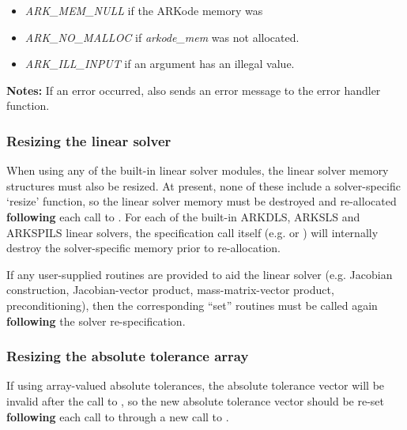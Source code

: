 \documentclass[letterpaper,10pt,english]{sphinxmanual}
\begin{document}
\begin{fulllineitems}
\begin{description}
\begin{itemize}
\item {} 
\emph{ARK\_MEM\_NULL}  if the ARKode memory was 

\item {} 
\emph{ARK\_NO\_MALLOC} if \emph{arkode\_mem} was not allocated.

\item {} 
\emph{ARK\_ILL\_INPUT} if an argument has an illegal value.

\end{itemize}

\end{description}

\textbf{Notes:} If an error occurred, {\hyperref[c_interface/User_callable:c.ARKodeResize]{\emph{}}} also sends an error
message to the error handler function.

\end{fulllineitems}



\subsubsection{Resizing the linear solver}
\label{c_interface/User_callable:resizing-the-linear-solver}
When using any of the built-in linear solver modules, the linear
solver memory structures must also be resized.  At present, none of
these include a solver-specific `resize' function, so the linear
solver memory must be destroyed and re-allocated \textbf{following} each
call to {\hyperref[c_interface/User_callable:c.ARKodeResize]{\emph{}}}.  For each of the built-in ARKDLS,
ARKSLS and ARKSPILS linear solvers, the specification call itself
(e.g. {\hyperref[c_interface/User_callable:c.ARKDense]{\emph{}}} or {\hyperref[c_interface/User_callable:c.ARKSpgmr]{\emph{}}}) will internally
destroy the solver-specific memory prior to re-allocation.

If any user-supplied routines are provided to aid the linear solver
(e.g. Jacobian construction, Jacobian-vector product,
mass-matrix-vector product, preconditioning), then the corresponding
``set'' routines must be called again \textbf{following} the solver
re-specification.


\subsubsection{Resizing the absolute tolerance array}
\label{c_interface/User_callable:resizing-the-absolute-tolerance-array}
If using array-valued absolute tolerances, the absolute tolerance
vector will be invalid after the call to {\hyperref[c_interface/User_callable:c.ARKodeResize]{\emph{}}}, so
the new absolute tolerance vector should be re-set \textbf{following} each
call to {\hyperref[c_interface/User_callable:c.ARKodeResize]{\emph{}}} through a new call to
{\hyperref[c_interface/User_callable:c.ARKodeSVtolerances]{\emph{}}}.
\end{document}
